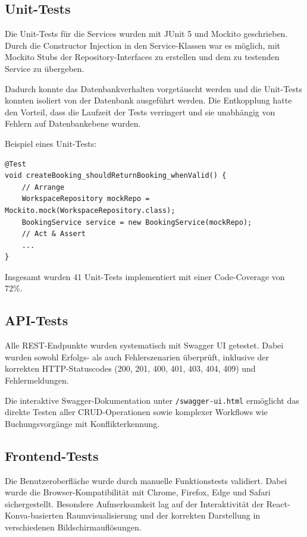 \documentclass[11pt,a4paper]{report}
\begin{document}
\subsection{Unit-Tests}

Die Unit-Tests für die Services wurden mit JUnit 5 und Mockito geschrieben. Durch die Constructor Injection in den Service-Klassen war es möglich, mit Mockito Stubs der Repository-Interfaces zu erstellen und dem zu testenden Service zu übergeben.

Dadurch konnte das Datenbankverhalten vorgetäuscht werden und die Unit-Tests konnten isoliert von der Datenbank ausgeführt werden. Die Entkopplung hatte den Vorteil, dass die Laufzeit der Tests verringert und sie unabhängig von Fehlern auf Datenbankebene wurden.

Beispiel eines Unit-Tests:

\begin{verbatim}
@Test
void createBooking_shouldReturnBooking_whenValid() {
    // Arrange
    WorkspaceRepository mockRepo = Mockito.mock(WorkspaceRepository.class);
    BookingService service = new BookingService(mockRepo);
    // Act & Assert
    ...
}
\end{verbatim}

Insgesamt wurden 41 Unit-Tests implementiert mit einer Code-Coverage von 72\%.


\subsection{API-Tests}

Alle REST-Endpunkte wurden systematisch mit Swagger UI getestet. Dabei wurden sowohl Erfolgs- als auch Fehlerszenarien überprüft, inklusive der korrekten HTTP-Statuscodes (200, 201, 400, 401, 403, 404, 409) und Fehlermeldungen.

Die interaktive Swagger-Dokumentation unter \texttt{/swagger-ui.html} ermöglicht das direkte Testen aller CRUD-Operationen sowie komplexer Workflows wie Buchungsvorgänge mit Konflikterkennung.

\subsection{Frontend-Tests}

Die Benutzeroberfläche wurde durch manuelle Funktionstests validiert. Dabei wurde die Browser-Kompatibilität mit Chrome, Firefox, Edge und Safari sichergestellt. Besondere Aufmerksamkeit lag auf der Interaktivität der React-Konva-basierten Raumvisualisierung und der korrekten Darstellung in verschiedenen Bildschirmauflösungen.
\end{document}
